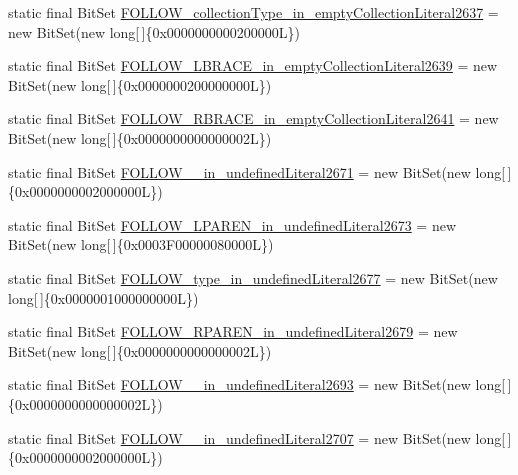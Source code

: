 \begin{DoxyCompactItemize}
\item 
static final Bit\-Set \hyperlink{classorg_1_1tzi_1_1use_1_1parser_1_1ocl_1_1_o_c_l_parser_a30d8e6f22fc41f869b70bbe2e3acc291}{F\-O\-L\-L\-O\-W\-\_\-collection\-Type\-\_\-in\-\_\-empty\-Collection\-Literal2637} = new Bit\-Set(new long\mbox{[}$\,$\mbox{]}\{0x0000000000200000\-L\})
\item 
static final Bit\-Set \hyperlink{classorg_1_1tzi_1_1use_1_1parser_1_1ocl_1_1_o_c_l_parser_ab92fe5b659c3b4caabc9d25297ee13e2}{F\-O\-L\-L\-O\-W\-\_\-\-L\-B\-R\-A\-C\-E\-\_\-in\-\_\-empty\-Collection\-Literal2639} = new Bit\-Set(new long\mbox{[}$\,$\mbox{]}\{0x0000000200000000\-L\})
\item 
static final Bit\-Set \hyperlink{classorg_1_1tzi_1_1use_1_1parser_1_1ocl_1_1_o_c_l_parser_a6bed7ff10b3cc7e28dbdedebe3dc6cc4}{F\-O\-L\-L\-O\-W\-\_\-\-R\-B\-R\-A\-C\-E\-\_\-in\-\_\-empty\-Collection\-Literal2641} = new Bit\-Set(new long\mbox{[}$\,$\mbox{]}\{0x0000000000000002\-L\})
\item 
static final Bit\-Set \hyperlink{classorg_1_1tzi_1_1use_1_1parser_1_1ocl_1_1_o_c_l_parser_a424567f3201a5ae12019ef12af9b27c7}{F\-O\-L\-L\-O\-W\-\_\-\_\-in\-\_\-undefined\-Literal2671} = new Bit\-Set(new long\mbox{[}$\,$\mbox{]}\{0x0000000002000000\-L\})
\item 
static final Bit\-Set \hyperlink{classorg_1_1tzi_1_1use_1_1parser_1_1ocl_1_1_o_c_l_parser_ad008d3c591f3c1087e2ddee80dbf1ddf}{F\-O\-L\-L\-O\-W\-\_\-\-L\-P\-A\-R\-E\-N\-\_\-in\-\_\-undefined\-Literal2673} = new Bit\-Set(new long\mbox{[}$\,$\mbox{]}\{0x0003\-F00000080000\-L\})
\item 
static final Bit\-Set \hyperlink{classorg_1_1tzi_1_1use_1_1parser_1_1ocl_1_1_o_c_l_parser_a26d289848967de9df410249fbd973850}{F\-O\-L\-L\-O\-W\-\_\-type\-\_\-in\-\_\-undefined\-Literal2677} = new Bit\-Set(new long\mbox{[}$\,$\mbox{]}\{0x0000001000000000\-L\})
\item 
static final Bit\-Set \hyperlink{classorg_1_1tzi_1_1use_1_1parser_1_1ocl_1_1_o_c_l_parser_a0ea6b8425e78dbeae78653cd7853e8b1}{F\-O\-L\-L\-O\-W\-\_\-\-R\-P\-A\-R\-E\-N\-\_\-in\-\_\-undefined\-Literal2679} = new Bit\-Set(new long\mbox{[}$\,$\mbox{]}\{0x0000000000000002\-L\})
\item 
static final Bit\-Set \hyperlink{classorg_1_1tzi_1_1use_1_1parser_1_1ocl_1_1_o_c_l_parser_af2eeafbad5561d49ccb0b2629d5f7672}{F\-O\-L\-L\-O\-W\-\_\-\_\-in\-\_\-undefined\-Literal2693} = new Bit\-Set(new long\mbox{[}$\,$\mbox{]}\{0x0000000000000002\-L\})
\item 
static final Bit\-Set \hyperlink{classorg_1_1tzi_1_1use_1_1parser_1_1ocl_1_1_o_c_l_parser_a34708856f7aa4bdf1d2f250167640c86}{F\-O\-L\-L\-O\-W\-\_\-\_\-in\-\_\-undefined\-Literal2707} = new Bit\-Set(new long\mbox{[}$\,$\mbox{]}\{0x0000000002000000\-L\})

\end{DoxyCompactItemize}
